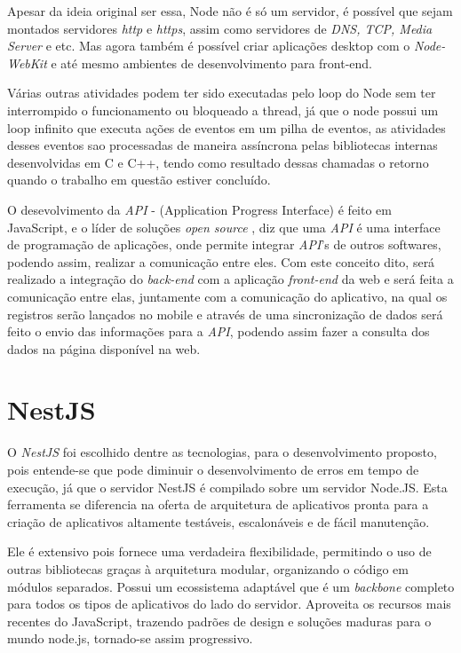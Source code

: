 Apesar da ideia original ser essa, Node não é só um servidor, é possível que sejam montados servidores \textit{http} e  \textit{https}, assim como servidores de  \textit{DNS, TCP, Media Server} e etc. Mas agora também é possível criar aplicações desktop com o  \textit{Node-WebKit} e até mesmo ambientes de desenvolvimento para front-end. \cite{node1}


Várias outras atividades podem ter sido executadas pelo loop do Node sem ter interrompido o funcionamento ou bloqueado a thread, já que o node possui um loop infinito que executa ações de eventos em um pilha de eventos, as atividades desses eventos sao processadas de maneira assíncrona pelas bibliotecas internas desenvolvidas em C e C++, tendo como resultado dessas chamadas o retorno quando o trabalho em questão estiver concluído.

O desevolvimento da \textit{API} - (Application Progress Interface) é feito em JavaScript,  e o líder de soluções \textit{open source} , diz que uma \textit{API} é uma interface de programação de aplicações, onde permite integrar \textit{API}'s de outros softwares, podendo assim, realizar a comunicação entre eles. Com este conceito dito, será realizado a integração do \textit{back-end} com a aplicação \textit{front-end} da web e será feita a comunicação entre elas, juntamente com a comunicação do aplicativo, na qual os registros serão lançados no mobile e através de uma sincronização de dados será feito o envio das informações para a \textit{API}, podendo assim fazer a consulta dos dados na página disponível na web.

\section{NestJS}
O \textit{NestJS} foi escolhido dentre as tecnologias, para o desenvolvimento proposto, pois entende-se que pode diminuir o desenvolvimento de erros em tempo de execução, já que o servidor NestJS é compilado sobre um servidor Node.JS. Esta ferramenta se diferencia na oferta de arquitetura de aplicativos pronta para a criação de aplicativos altamente testáveis, escalonáveis e de fácil manutenção.

Ele é extensivo pois fornece uma verdadeira flexibilidade, permitindo o uso de outras bibliotecas graças à arquitetura modular, organizando o código em módulos separados. Possui um ecossistema adaptável que é um \textit{backbone} completo para todos os tipos de aplicativos do lado do servidor. Aproveita os recursos mais recentes do JavaScript, trazendo padrões de design e soluções maduras para o mundo node.js, tornado-se assim progressivo. \cite{nest}

